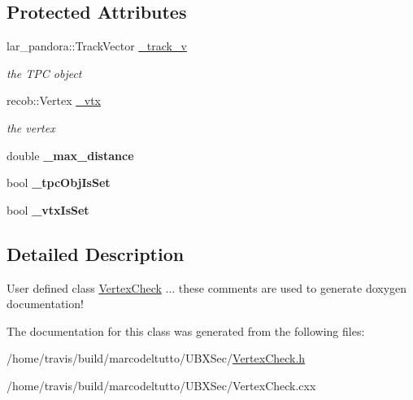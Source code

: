 \subsection*{\-Protected \-Attributes}
\begin{DoxyCompactItemize}
\item 
\hypertarget{classubxsec_1_1VertexCheck_a1597d56476f86cd31dfe20bfd4dfd2e4}{lar\-\_\-pandora\-::\-Track\-Vector \hyperlink{classubxsec_1_1VertexCheck_a1597d56476f86cd31dfe20bfd4dfd2e4}{\-\_\-track\-\_\-v}}\label{classubxsec_1_1VertexCheck_a1597d56476f86cd31dfe20bfd4dfd2e4}

\begin{DoxyCompactList}\small\item\em the \-T\-P\-C object \end{DoxyCompactList}\item 
\hypertarget{classubxsec_1_1VertexCheck_aee9bc0330ac01723fb2fdd27013df545}{recob\-::\-Vertex \hyperlink{classubxsec_1_1VertexCheck_aee9bc0330ac01723fb2fdd27013df545}{\-\_\-vtx}}\label{classubxsec_1_1VertexCheck_aee9bc0330ac01723fb2fdd27013df545}

\begin{DoxyCompactList}\small\item\em the vertex \end{DoxyCompactList}\item 
\hypertarget{classubxsec_1_1VertexCheck_a1a7f95e5e43a8640b994b8ab76f5a407}{double {\bfseries \-\_\-max\-\_\-distance}}\label{classubxsec_1_1VertexCheck_a1a7f95e5e43a8640b994b8ab76f5a407}

\item 
\hypertarget{classubxsec_1_1VertexCheck_a112bce9023b5c7eddabd3822b942099e}{bool {\bfseries \-\_\-tpc\-Obj\-Is\-Set}}\label{classubxsec_1_1VertexCheck_a112bce9023b5c7eddabd3822b942099e}

\item 
\hypertarget{classubxsec_1_1VertexCheck_aca700a4e256861947c51bf2cded436c5}{bool {\bfseries \-\_\-vtx\-Is\-Set}}\label{classubxsec_1_1VertexCheck_aca700a4e256861947c51bf2cded436c5}

\end{DoxyCompactItemize}


\subsection{\-Detailed \-Description}
\-User defined class \hyperlink{classubxsec_1_1VertexCheck}{\-Vertex\-Check} ... these comments are used to generate doxygen documentation! 

\-The documentation for this class was generated from the following files\-:\begin{DoxyCompactItemize}
\item 
/home/travis/build/marcodeltutto/\-U\-B\-X\-Sec/\hyperlink{VertexCheck_8h}{\-Vertex\-Check.\-h}\item 
/home/travis/build/marcodeltutto/\-U\-B\-X\-Sec/\-Vertex\-Check.\-cxx\end{DoxyCompactItemize}
